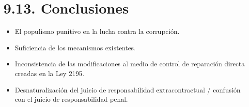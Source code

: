 \section{9.13. Conclusiones}
\begin{itemize}
\item El populismo punitivo en la lucha contra la corrupción.
\item Suficiencia de los mecanismos existentes.
\item Inconsistencia de las modificaciones al medio de control de reparación directa creadas en la Ley 2195.
\item Desnaturalización del juicio de responsabilidad extracontractual / confusión con el juicio de responsabilidad penal.
\end{itemize}
